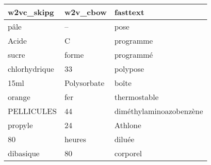 \begin{tabular}{lll}
\toprule
    w2vc\_skipg &     w2v\_cbow &                 fasttext \\
\midrule
          pâle &            – &                     pose \\
         Acide &            C &                programme \\
         sucre &        forme &                programmé \\
 chlorhydrique &           33 &                 polypose \\
          15ml &  Polysorbate &                    boîte \\
        orange &          fer &             thermostable \\
    PELLICULES &           44 &  diméthylaminoazobenzène \\
       propyle &           24 &                  Athlone \\
            80 &       heures &                   diluée \\
     dibasique &           80 &                 corporel \\
\bottomrule
\end{tabular}
